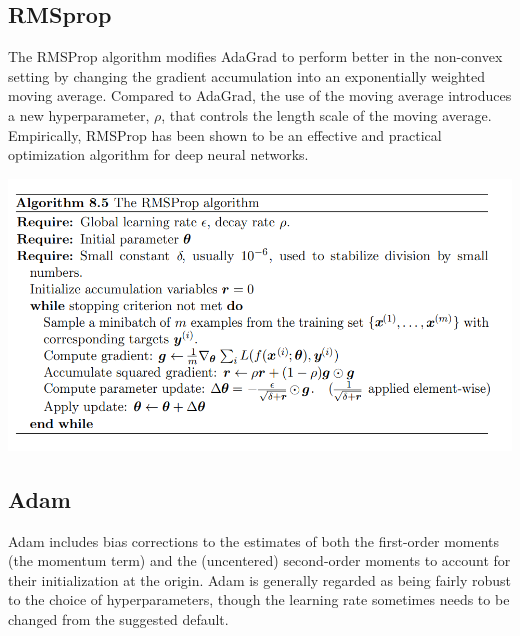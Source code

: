 \subsection{RMSprop}
The RMSProp algorithm modifies AdaGrad to perform better in the non-convex setting by changing the gradient accumulation into an exponentially weighted moving average.\newline\newline
Compared to AdaGrad, the use of the moving average introduces a new hyperparameter, $\rho$, that controls the length scale of the moving average. Empirically, RMSProp has been shown to be an effective and practical optimization algorithm for deep neural networks.
\begin{center}
    \includegraphics[scale=0.7]{images/RMSProp.png}
\end{center}

\subsection{Adam}
Adam includes bias corrections to the estimates of both the first-order moments (the momentum term) and the (uncentered) second-order moments to account for their initialization at the origin.\newline\newline
Adam is generally regarded as being fairly robust to the choice
of hyperparameters, though the learning rate sometimes needs to be changed from the suggested default.

